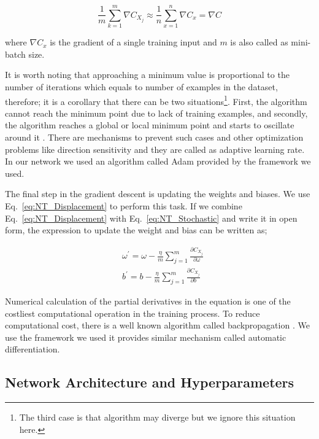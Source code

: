 \documentclass[a4paper,times,hidelinks,12pt]{article}
\begin{document}
\begin{equation}
\label{eq:NT_Stochastic}
\frac{1}{m} \sum\limits_{k = 1}^{m} \nabla{C_{X_j}} \approx \frac{1}{n}\sum\limits_{x = 1}^{n} \nabla{C_{x}} = \nabla{C}
\end{equation}

\noindent where $\nabla{C_x}$ is the gradient of a single training input and $m$ is also called as mini-batch size.

It is worth noting that approaching a minimum value is proportional to the number of iterations which equals to number of examples in the dataset, therefore; it is a corollary that there can be two situations\footnote{The third case is that algorithm may diverge but we ignore this situation here.}. First, the algorithm cannot reach the minimum point due to lack of training examples, and secondly, the algorithm reaches a global or local minimum point and starts to oscillate around it \cite{zeiler2012adadelta}. There are mechanisms to prevent such cases and other optimization problems like direction sensitivity and they are called as adaptive learning rate. In our network we used an algorithm called Adam \cite{kingma2014adam} provided by the framework we used.  

The final step in the gradient descent is updating the weights and biases. We use Eq.~\eqref{eq:NT_Displacement} to perform this task. If we combine Eq.~\eqref{eq:NT_Displacement} with Eq.~\eqref{eq:NT_Stochastic} and write it in open form, the expression to update the weight and bias can be written as;

\begin{equation}
\label{eq:NT_weight_bias_update}
\begin{split}
& \omega^{\prime} = \omega - \frac{\eta}{m} \sum\limits_{j = 1}^{m} \frac{\partial{C_{X_j}}}{\partial{\omega}} \\
& b^{\prime} = b- \frac{\eta}{m} \sum\limits_{j = 1}^{m} \frac{\partial{C_{X_j}}}{\partial{b}}
\end{split}
\end{equation}

\noindent Numerical calculation of the partial derivatives in the equation is one of the costliest computational operation in the training process. To reduce computational cost, there is a well known algorithm called backpropagation \cite{goodfellow2016deep}. We use the framework we used it provides similar mechanism called automatic differentiation. 

\subsection{Network Architecture and Hyperparameters}
\end{document}
